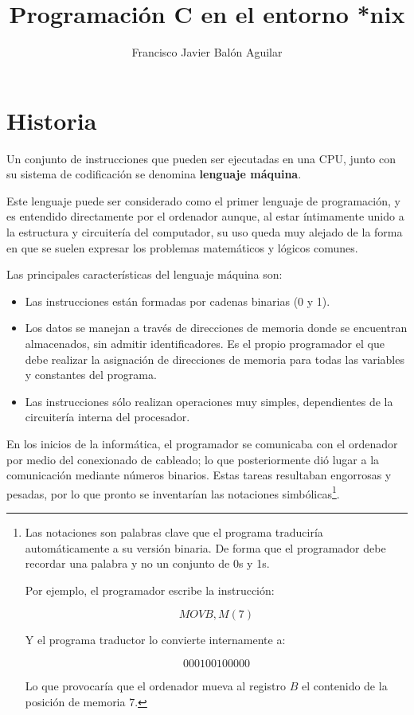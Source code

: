 \documentclass[a4paper, 11pt, titlepage]{article}
\title{Programación C en el entorno *nix}
\author{Francisco Javier Balón Aguilar}
\begin{document}
\maketitle
\renewcommand{\contentsname}{Índice}
\tableofcontents
\newpage

\section{Historia}

    Un conjunto de instrucciones que pueden ser ejecutadas en una CPU, junto con su 
    sistema de codificación se denomina \textbf{lenguaje máquina}.

    Este lenguaje puede ser considerado como el primer lenguaje de programación, y 
    es entendido directamente por el ordenador aunque, al estar íntimamente 
    unido a la estructura y circuitería del computador, su uso queda muy alejado de 
    la forma en que se suelen expresar los problemas matemáticos y lógicos comunes.

    Las principales características del lenguaje máquina son:

    \begin{itemize}
        \item Las instrucciones están formadas por cadenas binarias (0 y 1).
        \item Los datos se manejan a través de direcciones de memoria donde se encuentran
        almacenados, sin admitir identificadores. Es el propio programador el que debe 
        realizar la asignación de direcciones de memoria para todas las variables y 
        constantes del programa.
        \item Las instrucciones sólo realizan operaciones muy simples, dependientes de 
        la circuitería interna del procesador.
    \end{itemize}

    En los inicios de la informática, el programador se comunicaba con el ordenador 
    por medio del conexionado de cableado; lo que posteriormente dió lugar a la 
    comunicación mediante números binarios. Estas tareas resultaban engorrosas y pesadas, 
    por lo que pronto se inventarían las notaciones simbólicas\footnote{
        Las notaciones son palabras clave que el programa traduciría automáticamente 
        a su versión binaria. De forma que el programador debe recordar una palabra
        y no un conjunto de 0s y 1s.

        Por ejemplo, el programador escribe la instrucción:

        \[MOV B , M(7)\]

        Y el programa traductor lo convierte internamente a:

        \[000100100000\]

        Lo que provocaría que el ordenador mueva al registro $B$ el contenido de la posición 
        de memoria $7$.
    }.
\end{document}
